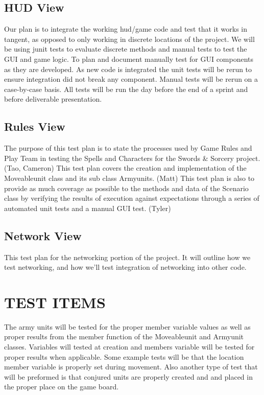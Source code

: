 {
\color{black}
\subsection{HUD View}
Our plan is to integrate the working hud/game code and test that it works in tangent, as opposed to only working in discrete locations of the project. We will be using junit tests to evaluate discrete methods and manual tests to test the GUI and game logic. To plan and document manually test for GUI components as they are developed.  As new code is integrated the unit tests will be rerun to ensure integration did not break any component. Manual tests will be rerun on a case-by-case basis. All tests will be run the day before the end of a sprint and before deliverable presentation.

\color{black}
\subsection{Rules View} %
The purpose of this test plan is to state the processes used by Game Rules and Play Team in testing the Spells and Characters for the Swords \& Sorcery project.(Tao, Cameron)
\newline
\newline
This test plan covers the creation and implementation of the Moveableunit class and its sub class Armyunits. (Matt)
\newline
\newline
This test plan is also to provide as much coverage as possible to the methods and data of the Scenario class by verifying the results of execution against expectations through a series of automated unit tests and a manual GUI test. (Tyler)

\color{black}
\subsection{Network View}
This test plan for the networking portion of the project. It will outline how we test networking, and how we'll test integration of networking into other code.
}


\section[TEST ITEMS]{\bfseries\color{black} TEST ITEMS}

{\color{black}

The army units will be tested for the proper member variable values as well as proper results from the member function of the Moveableunit and Armyunit classes. Variables will tested at creation and members variable will be tested for proper results when applicable. Some example tests will be that the location member variable is properly set during movement. Also another type of test that will be preformed is that conjured units are properly created and and placed in the proper place on the game board. 
}

